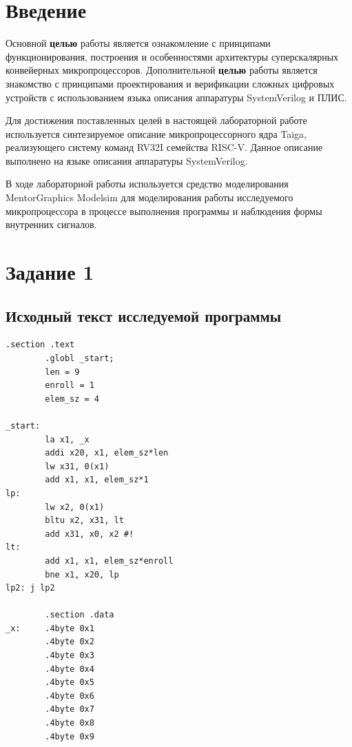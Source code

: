 \documentclass{article}
\begin{document}
\section{Введение}
Основной \textbf{целью} работы является ознакомление с принципами функционирования, построения и особенностями 
архитектуры суперскалярных конвейерных микропроцессоров. Дополнительной \textbf{целью} работы является знакомство с 
принципами проектирования и верификации сложных цифровых устройств с использованием языка описания аппаратуры 
SystemVerilog и ПЛИС.

Для достижения поставленных целей в настоящей лабораторной работе используется синтезируемое описание 
микропроцессорного ядра Taiga, реализующего систему команд RV32I семейства RISC-V. Данное описание выполнено на языке 
описания аппаратуры SystemVerilog.

В ходе лабораторной работы используется средство моделирования MentorGraphics Modelsim для моделирования работы 
исследуемого микропроцессора в процессе выполнения программы и наблюдения формы внутренних сигналов.

\section{Задание 1}
\subsection{Исходный текст исследуемой программы}
\begin{lstlisting}[style=lst, caption=Исходный текст исследуемой программы]
.section .text
        .globl _start;
        len = 9
        enroll = 1
        elem_sz = 4

_start:
        la x1, _x
        addi x20, x1, elem_sz*len
        lw x31, 0(x1)
        add x1, x1, elem_sz*1
lp:
        lw x2, 0(x1)
        bltu x2, x31, lt
        add x31, x0, x2 #!
lt:
        add x1, x1, elem_sz*enroll
        bne x1, x20, lp
lp2: j lp2

        .section .data
_x:     .4byte 0x1
        .4byte 0x2
        .4byte 0x3
        .4byte 0x4
        .4byte 0x5
        .4byte 0x6
        .4byte 0x7
        .4byte 0x8
        .4byte 0x9
\end{lstlisting}
\end{document}
